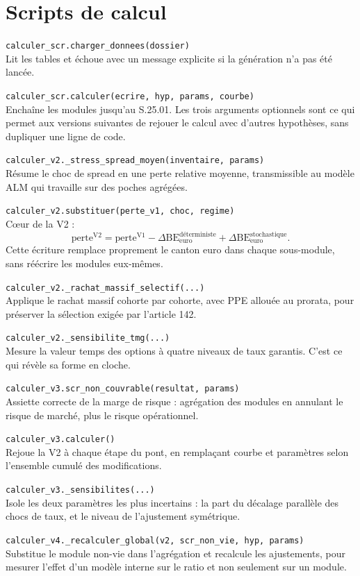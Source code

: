 \documentclass[10pt,a4paper]{article}
\newcommand{\fn}[2]{\par\smallskip\textcolor{bleufonce}{\texttt{#1}}\\ #2\par}
\begin{document}
\section{Scripts de calcul}

\fn{calculer\_scr.charger\_donnees(dossier)}{Lit les tables et échoue avec un message explicite
si la génération n'a pas été lancée.}

\fn{calculer\_scr.calculer(ecrire, hyp, params, courbe)}{Enchaîne les modules jusqu'au S.25.01.
Les trois arguments optionnels sont ce qui permet aux versions suivantes de rejouer le calcul
avec d'autres hypothèses, sans dupliquer une ligne de code.}

\fn{calculer\_v2.\_stress\_spread\_moyen(inventaire, params)}{Résume le choc de spread en une
perte relative moyenne, transmissible au modèle ALM qui travaille sur des poches agrégées.}

\fn{calculer\_v2.substituer(perte\_v1, choc, regime)}{Cœur de la V2 :
\[
\mathrm{perte}^{\mathrm{V2}} = \mathrm{perte}^{\mathrm{V1}}
- \Delta\mathrm{BE}^{\text{déterministe}}_{\text{euro}}
+ \Delta\mathrm{BE}^{\text{stochastique}}_{\text{euro}} .
\]
Cette écriture remplace proprement le canton euro dans chaque sous-module, sans réécrire les
modules eux-mêmes.}

\fn{calculer\_v2.\_rachat\_massif\_selectif(...)}{Applique le rachat massif cohorte par cohorte,
avec PPE allouée au prorata, pour préserver la sélection exigée par l'article 142.}

\fn{calculer\_v2.\_sensibilite\_tmg(...)}{Mesure la valeur temps des options à quatre niveaux de
taux garantis. C'est ce qui révèle sa forme en cloche.}

\fn{calculer\_v3.scr\_non\_couvrable(resultat, params)}{Assiette correcte de la marge de risque :
agrégation des modules en annulant le risque de marché, plus le risque opérationnel.}

\fn{calculer\_v3.calculer()}{Rejoue la V2 à chaque étape du pont, en remplaçant courbe et
paramètres selon l'ensemble cumulé des modifications.}

\fn{calculer\_v3.\_sensibilites(...)}{Isole les deux paramètres les plus incertains : la part du
décalage parallèle des chocs de taux, et le niveau de l'ajustement symétrique.}

\fn{calculer\_v4.\_recalculer\_global(v2, scr\_non\_vie, hyp, params)}{Substitue le module
non-vie dans l'agrégation et recalcule les ajustements, pour mesurer l'effet d'un modèle interne
sur le ratio et non seulement sur un module.}
\end{document}

